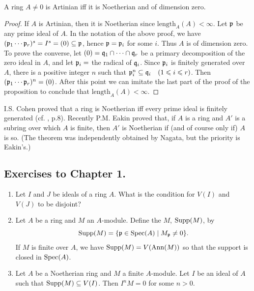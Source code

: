 \documentclass[../main]{subfiles}
\begin{document}
\begin{corollary*}
A ring $A\neq 0$ is Artinian iff it is Noetherian and of dimension zero.
\end{corollary*}
\begin{proof}
If $A$ is Artinian, then it is Noetherian since $\mathrm{length}_A(A)<\infty$. 
Let $\mathfrak{p}$ be any prime ideal of $A$. In the notation of the above proof, we have $(\mathfrak{p}_1\cdots\mathfrak{p}_r)^s=I^s=(0)\subseteq\mathfrak{p}$, hence $\mathfrak{p}=\mathfrak{p}_i$ for some $i$. Thus $A$ is of dimension zero. 
To prove the converse, let $(0)=\mathfrak{q}_1\cap\cdots\cap\mathfrak{q}_r$ be a primary decomposition of the zero ideal in $A$, and let $\mathfrak{p}_i=$ the radical of $\mathfrak{q}_i$. Since $\mathfrak{p}_i$ is finitely generated over $A$, there is a positive integer $n$ such that $\ideal{p}_i^n\subseteq\ideal{q}_i\for{1\leq i\leq r}$. Then $(\mathfrak{p}_1\cdots\mathfrak{p}_r)^n=(0)$. After this point we can imitate the last part of the proof of the proposition to conclude that $\mathrm{length}_A(A)<\infty$.
\end{proof}

\newparagraph
I.S. Cohen proved that a ring is Noetherian iff every prime ideal is finitely generated (cf. \cite{nagata1975local}, p.8). Recently P.M. Eakin \cite{eakin1968the} proved that, if $A$ is a ring and $A'$ is a subring over which $A$ is finite, then $A'$ is Noetherian if (and of course only if) $A$ is so. (The theorem was independently obtained by Nagata, but the priority is Eakin's.)

\subsection*{Exercises to Chapter 1.}
\begin{enumerate}
    \item Let $I$ and $J$ be ideals of a ring $A$. What is the condition for $V(I)$ and $V(J)$ to be disjoint?
    \item\label{sym:Supp} Let $A$ be a ring and $M$ an $A$-module. Define the $M$, $\operatorname{Supp}(M)$, by \[\operatorname{Supp}(M)=\{\mathfrak{p}\in\operatorname{Spec}(A)\mid M_{\mathfrak{p}}\neq 0\}.\] If $M$ is finite over $A$, we have $\operatorname{Supp}(M)=V(\operatorname{Ann}(M))$ so that the support is closed in $\operatorname{Spec}(A)$.
    \item Let $A$ be a Noetherian ring and $M$ a finite $A$-module. Let $I$ be an ideal of $A$ such that $\operatorname{Supp}(M)\subseteq V(I)$. Then $I^nM=0$ for some $n>0$.
\end{enumerate}
\end{document}
